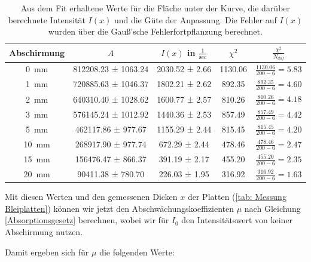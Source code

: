 \begin{table}[h] 
    \begin{tabular}{|c|c|c|c|c|}

    \hline 
    Abschirmung & $A$ & $I(x)$ in $\frac{1}{\si{\sec}}$ & $\chi^2$ & $\frac{\chi^2}{N_{dof}} $ \\
    \hline 
    \SI{0}{\mm} & 812208.23 ± 1063.24 & 2030.52 ± 2.66 & 1130.06 & $\frac{1130.06}{200-6}=5.83 $ \\ 
    \hline 
    \SI{1}{\mm} & 720885.63 ± 1046.37 & 1802.21 ± 2.62 & 892.35 & $\frac{892.35}{200-6}=4.60 $\\ 
    \hline 
    \SI{2}{\mm} & 640310.40 ± 1028.62 & 1600.77 ± 2.57 & 810.26 & $\frac{810.26}{200-6}=4.18 $ \\ 
    \hline 
    \SI{3}{\mm} & 576145.24 ± 1012.92 & 1440.36 ± 2.53 & 857.49 & $\frac{857.49}{200-6}=4.42 $ \\ 
    \hline 
    \SI{5}{\mm} & 462117.86 ± 977.67 & 1155.29 ± 2.44 & 815.45 & $\frac{815.45}{200-6}=4.20 $ \\ 
    \hline 
    \SI{10}{\mm} & 268917.90 ± 977.74 & 672.29 ± 2.44 & 478.46 & $\frac{478.46}{200-6}=2.47 $ \\ 
    \hline 
    \SI{15}{\mm} & 156476.47 ± 866.37 & 391.19 ± 2.17 & 455.20 & $\frac{455.20}{200-6}=2.35 $ \\ 
    \hline 
    \SI{20}{\mm} & 90411.38 ± 780.70 & 226.03 ± 1.95 & 316.92 & $\frac{316.92}{200-6}=1.63 $ \\ 
    \hline 

    \end{tabular}
    \label{tab: Fitergebnisse Gamma Blei}
    \caption{Aus dem Fit erhaltene Werte für die Fläche unter der Kurve, die darüber berechnete Intensität $I(x)$ und die Güte der Anpassung. Die Fehler auf $I(x)$ wurden über die Gauß'sche Fehlerfortpflanzung berechnet.}
\end{table}

Mit diesen Werten und den gemessenen Dicken $x$ der Platten (\ref{tab: Messung Bleiplatten}) können wir jetzt den Abschwächungskoeffizienten $\mu$ nach Gleichung \ref{Absorptionsgesetz} berechnen, wobei wir für $I_0$ den Intensitätswert von keiner Abschirmung nutzen.  

Damit ergeben sich für $\mu$ die folgenden Werte:


